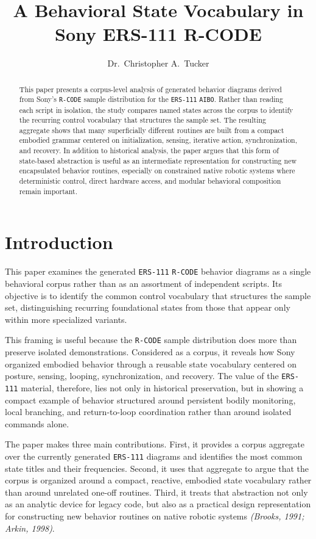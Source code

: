 \documentclass[11pt]{article}
\title{A Behavioral State Vocabulary in Sony ERS-111 R-CODE}
\author{Dr.\ Christopher A.\ Tucker}
\date{}
\begin{document}
\maketitle

\begin{abstract}
This paper presents a corpus-level analysis of generated behavior
diagrams derived from Sony's \texttt{R-CODE} sample distribution for the
\texttt{ERS-111} \texttt{AIBO}. Rather than reading each script in
isolation, the study compares named states across the corpus to
identify the recurring control vocabulary that structures the sample
set. The resulting aggregate shows that many superficially different
routines are built from a compact embodied grammar centered on
initialization, sensing, iterative action, synchronization, and
recovery. In addition to historical analysis, the paper argues that
this form of state-based abstraction is useful as an intermediate
representation for constructing new encapsulated behavior routines,
especially on constrained native robotic systems where deterministic
control, direct hardware access, and modular behavioral composition
remain important.
\end{abstract}

\section*{Introduction}

This paper examines the generated \texttt{ERS-111} \texttt{R-CODE}
behavior diagrams as a single behavioral corpus rather than as an
assortment of independent scripts. Its objective is to identify the
common control vocabulary that structures the sample set,
distinguishing recurring foundational states from those that appear
only within more specialized variants.

This framing is useful because the \texttt{R-CODE} sample distribution
does more than preserve isolated demonstrations. Considered as a
corpus, it reveals how Sony organized embodied behavior through a
reusable state vocabulary centered on posture, sensing, looping,
synchronization, and recovery. The value of the \texttt{ERS-111}
material, therefore, lies not only in historical preservation, but in
showing a compact example of behavior structured around persistent
bodily monitoring, local branching, and return-to-loop coordination
rather than around isolated commands alone.

The paper makes three main contributions. First, it provides a corpus
aggregate over the currently generated \texttt{ERS-111} diagrams and
identifies the most common state titles and their frequencies. Second,
it uses that aggregate to argue that the corpus is organized around a
compact, reactive, embodied state vocabulary rather than around
unrelated one-off routines. Third, it treats that abstraction not only
as an analytic device for legacy code, but also as a practical design
representation for constructing new behavior routines on native robotic
systems \textit{(Brooks, 1991; Arkin, 1998)}.
\end{document}
